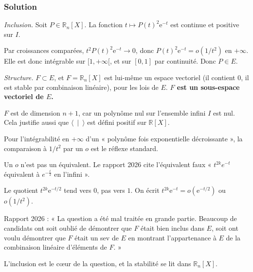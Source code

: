 \documentclass[11pt,a4paper]{article}
\begin{document}
\hypertarget{solution-12}{%
\subsubsection{Solution}\label{solution-12}}

\emph{Inclusion.} Soit \(P\in\mathbb R_n[X]\). La fonction \(t\mapsto P(t)^2\mathrm e^{-t}\) est continue et positive sur \(I\).

Par croissances comparées, \(t^2P(t)^2\mathrm e^{-t}\to0\), donc \(P(t)^2\mathrm e^{-t}=o(1/t^2)\) en \(+\infty\). Elle est donc intégrable sur \([1,+\infty[\), et sur \([0,1]\) par continuité. Donc \(P\in E\).

\emph{Structure.} \(F\subset E\), et \(F=\mathbb R_n[X]\) est lui-même un espace vectoriel (il contient \(0\), il est stable par combinaison linéaire), pour les lois de \(E\). \textbf{\(F\) est un sous-espace vectoriel de \(E\).}

\(F\) est de dimension \(n+1\), car un polynôme nul sur l'ensemble infini \(I\) est nul. Cela justifie aussi que \(\langle\ \mid\ \rangle\) est défini positif sur \(\mathbb R[X]\).

\begin{methode}

Pour l'intégrabilité en \(+\infty\) d'un « polynôme fois exponentielle décroissante », la comparaison à \(1/t^2\) par un \(o\) est le réflexe standard.

\end{methode}

\begin{piege}

Un \(o\) n'est pas un équivalent. Le rapport 2026 cite l'équivalent faux « \(t^{2k}e^{-t}\) équivalent à \(e^{-\frac{t}{2}}\) en l'infini ».

Le quotient \(t^{2k}\mathrm e^{-t/2}\) tend vers \(0\), pas vers \(1\). On écrit \(t^{2k}\mathrm e^{-t}=o(\mathrm e^{-t/2})\) ou \(o(1/t^2)\).

\end{piege}

\begin{jury}

Rapport 2026 : « La question a été mal traitée en grande partie. Beaucoup de candidats ont soit oublié de démontrer que \(F\) était bien inclus dans \(E\), soit ont voulu démontrer que \(F\) était un sev de \(E\) en montrant l'appartenance à \(E\) de la combinaison linéaire d'éléments de \(F\). »

L'inclusion est le cœur de la question, et la stabilité se lit dans \(\mathbb R_n[X]\).

\end{jury}
\end{document}
